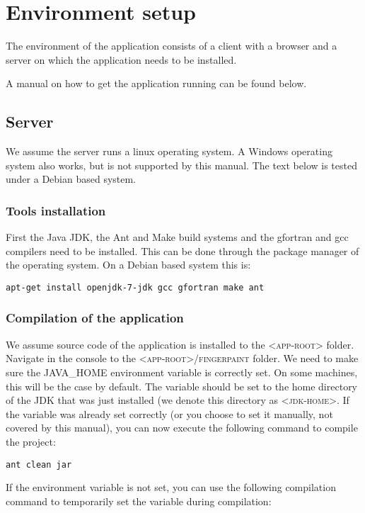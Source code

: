 \chapter{Environment setup}
\label{environment_setup}
The environment of the \applicationname{} application consists of a client with a browser and a server on which the application needs to be installed.

A manual on how to get the \applicationname{} application running can be found below.

\section{Server}
We assume the server runs a linux operating system. A Windows operating system also works, but is not supported by this manual. The text below is tested under a Debian based system.

\subsection{Tools installation}
First the Java JDK, the Ant and Make build systems and the gfortran and gcc compilers need to be installed. This can be done through the package manager of the operating system. On a Debian based system this is:

\begin{verbatim}
apt-get install openjdk-7-jdk gcc gfortran make ant
\end{verbatim}

\subsection{Compilation of the application}
We assume source code of the application is installed to the \textsc{<app-root>} folder.
Navigate in the console to the \textsc{<app-root>/fingerpaint} folder. 
We need to make sure the \textsc{JAVA_HOME} environment variable is correctly set. On some machines, this will
be the case by default. The variable should be set to the home directory of the JDK that was just installed (we denote this directory as \textsc{<jdk-home>}. If the variable was already set correctly (or you choose to set it manually, not covered by this manual), you can now execute the following command to compile the project:

\begin{verbatim}
ant clean jar
\end{verbatim}

If the environment variable is not set, you can use the following compilation command to temporarily set the variable during compilation:

